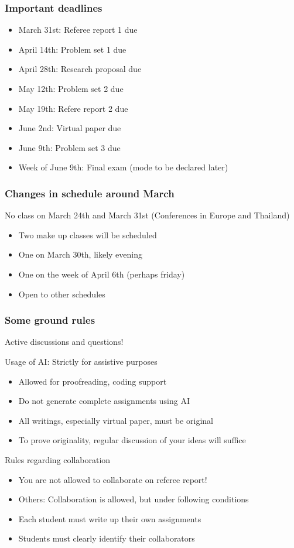 \documentclass[aspectratio=169]{beamer}
\begin{document}
\begin{frame}
\frametitle{Important deadlines} 
\begin{itemize}\setlength\itemsep{10pt}
\item March 31st: Referee report 1 due
\item April 14th: Problem set 1 due
\item April 28th: Research proposal due
\item May 12th: Problem set 2 due
\item May 19th: Refere report 2 due
\item June 2nd: Virtual paper due
\item June 9th: Problem set 3 due 
\item Week of June 9th: Final exam (mode to be declared later)
\end{itemize}
\end{frame}


\begin{frame}
\frametitle{Changes in schedule around March}
No class on March 24th and March 31st (Conferences in Europe and Thailand) 
\begin{itemize}\setlength\itemsep{3pt}
\item Two make up classes will be scheduled
\item One on March 30th, likely evening
\item One on the week of April 6th (perhaps friday)
\item Open to other schedules
\end{itemize}
\end{frame}




 
\begin{frame}
\frametitle{Some ground rules} 
Active discussions and questions!\par \medskip
 Usage of AI: Strictly for assistive purposes
\begin{itemize}\setlength\itemsep{3pt}
\item Allowed for proofreading, coding support
\item Do not generate complete assignments using AI 
\item All writings, especially virtual paper, must be original
\item To prove originality, regular discussion of your ideas will suffice
\end{itemize} \medskip
Rules regarding collaboration
\begin{itemize}\setlength\itemsep{3pt}
\item You are not allowed to collaborate on referee report!
\item Others: Collaboration is allowed, but under following conditions 
\item Each student must write up their own assignments
\item Students must clearly identify their collaborators
\end{itemize}
\end{frame}
\end{document}
